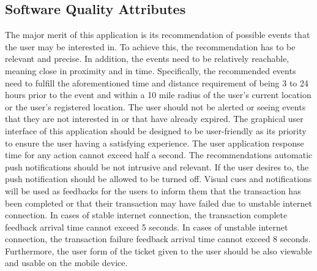 	\subsection{Software Quality Attributes}
		  The major merit of this application is its recommendation of possible events that the user may be interested in. To achieve this, the recommendation has to be relevant and precise. In addition, the events need to be relatively reachable, meaning close in proximity and in time. Specifically, the recommended events need to fulfill the aforementioned time and distance requirement of being 3 to 24 hours prior to the event and within a 10 mile radius of the user’s current location or the user’s registered location. The user should not be alerted or seeing events that they are not interested in or that have already expired. The graphical user interface of this application should be designed to be user-friendly as its priority to ensure the user having a satisfying experience. The user application response time for any action cannot exceed half a second. The recommendations automatic push notifications should be not intrusive and relevant. If the user desires to, the push notification should be allowed to be turned off. Visual cues and notifications will be used as feedbacks for the users to inform them that the transaction has been completed or that their transaction may have failed due to unstable internet connection. In cases of stable internet connection, the transaction complete feedback arrival time cannot exceed 5 seconds. In cases of unstable internet connection, the transaction failure feedback arrival time cannot exceed 8 seconds. Furthermore, the user form of the ticket given to the user should be also viewable and usable on the mobile device.